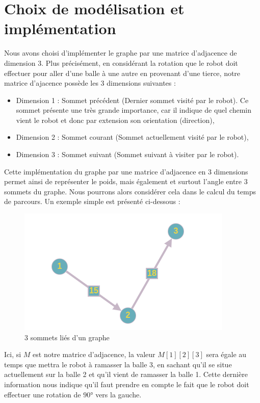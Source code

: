 \documentclass[12pt]{article}
\begin{document}
    \section{Choix de modélisation et implémentation}
    \label{sec:model_impl}

    Nous avons choisi d'implémenter le graphe par une matrice d'adjacence de dimension 3. Plus précisément, en considérant la rotation que le robot doit effectuer pour aller d'une balle à une autre en provenant d'une tierce, notre matrice d'ajacence possède les 3 dimensions suivantes :

    \begin{itemize}
        \item Dimension 1 : Sommet précédent (Dernier sommet visité par le robot). Ce sommet présente une très grande importance, car il indique de quel chemin vient le robot et donc par extension son orientation (direction),
        \item Dimension 2 : Sommet courant (Sommet actuellement visité par le robot),
        \item Dimension 3 : Sommet suivant (Sommet suivant à visiter par le robot).
    \end{itemize}

    Cette implémentation du graphe par une matrice d'adjacence en 3 dimensions permet ainsi de représenter le poids, mais également et surtout l'angle entre 3 sommets du graphe. Nous pourrons alors considérer cela dans le calcul du temps de parcours. Un exemple simple est présenté ci-dessous :

    \begin{figure}[H]
        \centering
        \includegraphics[scale=0.7]{img/example_3dim}
        \caption{3 sommets liés d'un graphe}
        \label{img_3somlinked}
    \end{figure}

    Ici, si $M$ est notre matrice d'adjacence, la valeur $M[1][2][3]$ sera égale au temps que mettra le robot à ramasser la balle 3, en sachant qu'il se situe actuellement sur la balle 2 et qu'il vient de ramasser la balle 1. Cette dernière information nous indique qu'il faut prendre en compte le fait que le robot doit effectuer une rotation de $90$° vers la gauche.
\end{document}
